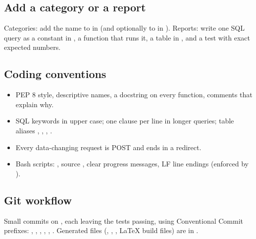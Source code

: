 \documentclass[11pt,a4paper]{article}
\begin{document}
\subsection{Add a category or a report}
Categories: add the name to  in  (and optionally to  in
). Reports: write one SQL query as a constant in , a function that runs
it, a table in , and a test with exact expected numbers.

\subsection{Coding conventions}
\begin{itemize}
  \item PEP 8 style, descriptive names, a docstring on every function, comments that explain why.
  \item SQL keywords in upper case; one clause per line in longer queries; table aliases
        , , , .
  \item Every data-changing request is POST and ends in a redirect.
  \item Bash scripts: , source , clear  progress
        messages, LF line endings (enforced by ).
\end{itemize}

\subsection{Git workflow}
Small commits on , each leaving the tests passing, using Conventional Commit prefixes:
, , , , , . Generated files
(, , , LaTeX build files) are in .
\end{document}
